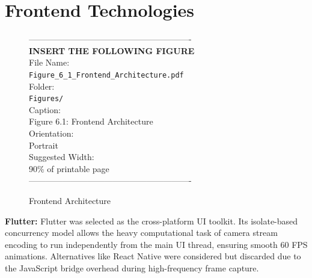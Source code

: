 \documentclass[12pt, a4paper]{report}
\begin{document}
\section{Frontend Technologies}
\vspace{1em}
\begin{figure}[htbp]
\begin{center}
----------------------------------------------------------\\
\vspace{0.5em}
\textbf{INSERT THE FOLLOWING FIGURE}\\
\vspace{1em}
File Name:\\
\texttt{Figure\_6\_1\_Frontend\_Architecture.pdf}\\
\vspace{1em}
Folder:\\
\texttt{Figures/}\\
\vspace{1em}
Caption:\\
Figure 6.1: Frontend Architecture\\
\vspace{1em}
Orientation:\\
Portrait\\
\vspace{1em}
Suggested Width:\\
90\% of printable page\\
\vspace{3cm}
----------------------------------------------------------
\end{center}
\caption{Frontend Architecture}
\label{fig:diag_3}
\end{figure}
\vspace{1em}
\textbf{Flutter:} Flutter was selected as the cross-platform UI toolkit. Its isolate-based concurrency model allows the heavy computational task of camera stream encoding to run independently from the main UI thread, ensuring smooth 60 FPS animations. Alternatives like React Native were considered but discarded due to the JavaScript bridge overhead during high-frequency frame capture.
\end{document}
